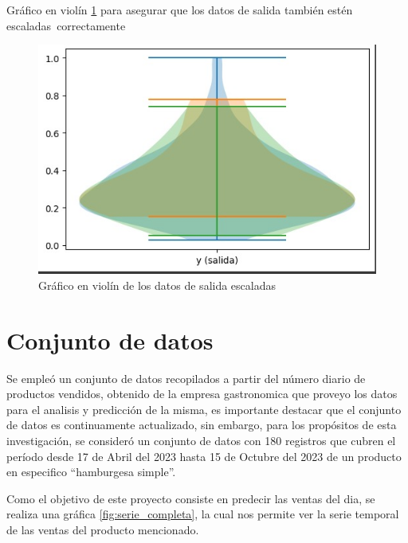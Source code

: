 \vspace{1\baselineskip}
Gráfico en violín \ref{fig:grafico_violin_salida} para asegurar que los datos de salida también estén escaladas correctamente
\begin{figure}[H]
  \begin{center}
    \includegraphics[scale=0.50]{./grafico_violin_salida.jpg}
    \caption{Gráfico en violín de los datos de salida escaladas}
    \label{fig:grafico_violin_salida}
  \end{center}
\end{figure}
\section{Conjunto de datos}


Se  empleó  un  conjunto  de  datos  recopilados  a  partir  del  número  diario  de  productos vendidos,  obtenido  de la empresa gastronomica que proveyo los datos para el analisis y predicción de la misma, es importante destacar que el conjunto de datos es continuamente actualizado, sin embargo, para los propósitos de esta investigación, se consideró un conjunto de datos con 180 registros que cubren el período desde 17 de Abril del 2023 hasta 15 de Octubre del 2023 de un producto en especifico “hamburgesa simple”.

Como el objetivo de este proyecto consiste en predecir las ventas del dia, se realiza una gráfica \ref{fig:serie_completa}, la cual nos permite ver la serie temporal de las ventas del producto mencionado. 

